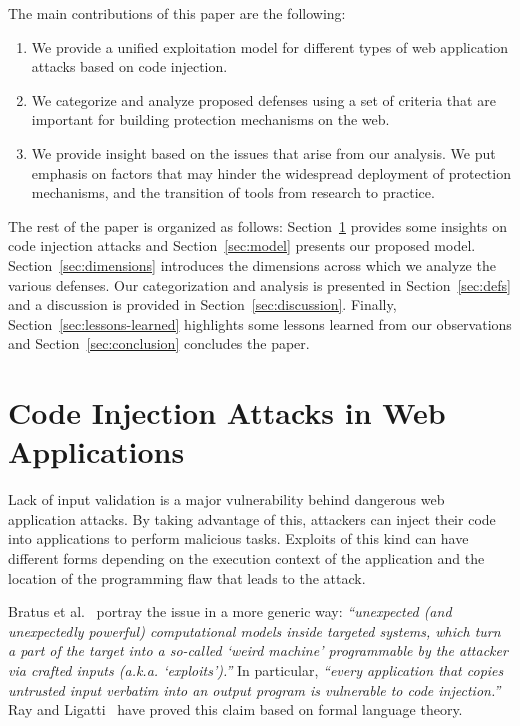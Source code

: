 \documentclass[10pt,journal,compsoc]{IEEEtran}
\begin{document}
The main contributions of this paper are the following:

\begin{enumerate}
\item We provide a unified exploitation model for different types of
  web application attacks based on code injection.
\item We categorize and analyze proposed defenses using a set of
  criteria that are important for building protection mechanisms on the web.
\item We provide insight based on the issues that arise from our analysis. We put
  emphasis on factors that may hinder the widespread deployment of
  protection mechanisms, and the transition of tools from research to practice.
\end{enumerate}

The rest of the paper is organized as follows:
Section~\ref{sec:attacks} provides some insights on
code injection attacks and
Section~\ref{sec:model} presents our proposed model.
Section~\ref{sec:dimensions} introduces the dimensions
across which we analyze the various defenses.
Our categorization and analysis is presented in
Section~\ref{sec:defs} and a discussion is provided in
Section~\ref{sec:discussion}. Finally,
Section~\ref{sec:lessons-learned} highlights
some lessons learned from our observations
and Section~\ref{sec:conclusion} concludes the paper.

\section{Code Injection Attacks in Web Applications}
\label{sec:attacks}

Lack of input validation is a major vulnerability behind dangerous web
application attacks. By taking advantage of this, attackers can inject
their code into applications to perform malicious tasks. Exploits of
this kind can have different forms depending on the execution context
of the application and the location of the programming flaw that leads
to the attack.

Bratus et al.~\cite{BLSPS11} portray the issue in a more generic way:
{\it ``unexpected (and unexpectedly powerful) computational models
  inside targeted systems, which turn a part of the target into a
  so-called `weird machine' programmable by the attacker via crafted
  inputs (a.k.a. `exploits').''} In particular, {\it ``every
  application that copies untrusted input verbatim into an output
  program is vulnerable to code injection.''} Ray and
Ligatti~\cite{RL12b} have proved this claim based on formal language
theory.
\end{document}
